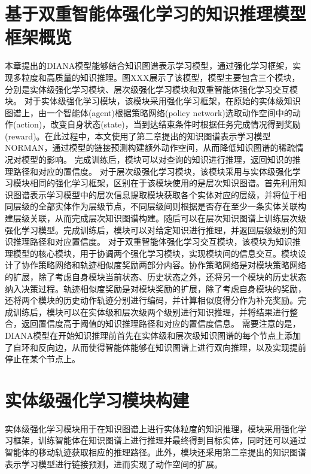 \documentclass[algorithmlist, AutoFakeBold, AutoFakeSlant, figurelist, tablelist, nomlist, masters]{seuthesix}
\begin{document}
\section{基于双重智能体强化学习的知识推理模型框架概览}
本章提出的DIANA模型能够结合知识图谱表示学习模型，通过强化学习框架，实现多粒度和高质量的知识推理。图XXX展示了该模型，模型主要包含三个模块，分别是实体级强化学习模块、层次级强化学习模块和双重智能体强化学习交互模块。
对于实体级强化学习模块，该模块采用强化学习框架，在原始的实体级知识图谱上，由一个智能体(agent)根据策略网络(policy network)选取动作空间中的动作(action)，改变自身状态(state)，当到达结束条件时根据任务完成情况得到奖励(reward)。在此过程中，本文使用了第二章提出的知识图谱表示学习模型NORMAN，通过模型的链接预测构建额外动作空间，从而降低知识图谱的稀疏情况对模型的影响。
完成训练后，模块可以对查询的知识进行推理，返回知识的推理路径和对应的置信度。
对于层次级强化学习模块，该模块采用与实体级强化学习模块相同的强化学习框架，区别在于该模块使用的是层次知识图谱。首先利用知识图谱表示学习模型中的层次信息提取模块获取各个实体对应的层级，并将位于相同层级的全部实体作为层级节点，不同层级间则根据是否存在至少一条实体关联构建层级关联，从而完成层次知识图谱构建。随后可以在层次知识图谱上训练层次级强化学习模型。完成训练后，模块可以对给定知识进行推理，并返回层级级别的知识推理路径和对应置信度。
对于双重智能体强化学习交互模块，该模块为知识推理模型的核心模块，用于协调两个强化学习模块，实现模块间的信息交互。模块设计了协作策略网络和轨迹相似度奖励两部分内容。协作策略网络是对模块策略网络的扩展，除了考虑自身模块当前状态、历史状态之外，还将另一个模块的历史状态纳入决策过程。轨迹相似度奖励是对模块奖励的扩展，除了考虑自身模块的奖励，还将两个模块的历史动作轨迹分别进行编码，并计算相似度得分作为补充奖励。完成训练后，模块可以在实体级和层次级两个级别进行知识推理，并将结果进行整合，返回置信度高于阈值的知识推理路径和对应的置信度信息。
需要注意的是，DIANA模型在开始知识推理前首先在实体级和层次级知识图谱的每个节点上添加了自环和反向边，从而使得智能体能够在知识图谱上进行双向推理，以及实现提前停止在某个节点上。

\section{实体级强化学习模块构建}
实体级强化学习模块用于在知识图谱上进行实体粒度的知识推理，模块采用强化学习框架，训练智能体在知识图谱上进行推理并最终得到目标实体，同时还可以通过智能体的移动轨迹获取相应的推理路径。此外，模块还采用第二章提出的知识图谱表示学习模型进行链接预测，进而实现了动作空间的扩展。
\end{document}
